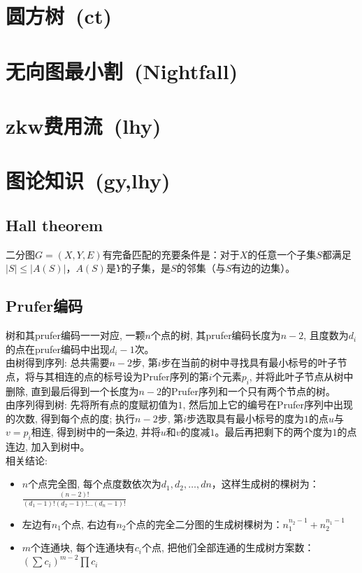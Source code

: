 \section{圆方树\ \small(ct)}
\section{无向图最小割\ \small(Nightfall)}
\section{zkw费用流\ \small(lhy)}
\section{图论知识\ \small(gy,lhy)}
	\subsection*{Hall theorem}
		二分图$ G = (X, Y, E) $有完备匹配的充要条件是：对于$ X $的任意一个子集$ S $都满足$ \left| S \right| \leq \left| A(S) \right| $，$ A(S) $是$ Y $的子集，是$ S $的邻集（与$ S $有边的边集）。
	\subsection*{Prufer编码}
		树和其prufer编码一一对应, 一颗$ n $个点的树, 其prufer编码长度为$ n − 2 $, 且度数为$ d_i $的点在prufer编码中出现$ d_i − 1 $次。
		\\由树得到序列: 总共需要$ n − 2 $步, 第$ i $步在当前的树中寻找具有最小标号的叶子节点，将与其相连的点的标号设为Prufer序列的第$ i $个元素$ p_i $, 并将此叶子节点从树中删除, 直到最后得到一个长度为$ n − 2 $的Prufer序列和一个只有两个节点的树。
		\\由序列得到树: 先将所有点的度赋初值为$ 1 $, 然后加上它的编号在Prufer序列中出现的次数, 得到每个点的度; 执行$ n − 2 $步, 第$ i $步选取具有最小标号的度为$ 1 $的点$ u $与$ v = p_i$相连, 得到树中的一条边, 并将$ u $和$ v $的度减$ 1 $。最后再把剩下的两个度为$ 1 $的点连边, 加入到树中。
		\\相关结论:
		\begin{itemize}[nosep,wide=0pt]
			\item $ n $个点完全图, 每个点度数依次为$ d_1, d_2 , \dots, dn $，这样生成树的棵树为：$ \frac{(n - 2) !}{(d_1 - 1)! (d_2 - 1)! \dots (d_n - 1)!} $
			\item 左边有$ n_1 $个点, 右边有$ n_2 $个点的完全二分图的生成树棵树为：$ n_1^{n_2 - 1} + n_2^{n_1 - 1} $
			\item $ m $个连通块, 每个连通块有$ c_i $个点, 把他们全部连通的生成树方案数：$ (\sum c_i)^{m - 2} \prod c_i $
		\end{itemize}
